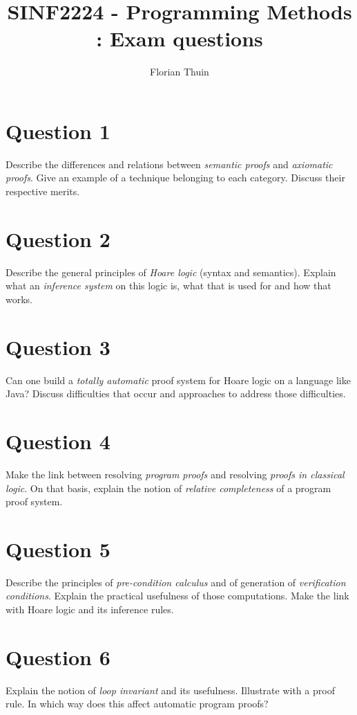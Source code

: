 \documentclass{article}
\author{Florian Thuin}
\title{SINF2224 - Programming Methods : Exam questions}
\begin{document}
  \section{Question 1}
  Describe the differences and relations between \textit{semantic proofs} and
  \textit{axiomatic proofs}. Give an example of a technique belonging to each
  category. Discuss their respective merits. \newline

  \section{Question 2}
  Describe the general principles of \textit{Hoare logic} (syntax and
  semantics). Explain what an \textit{inference system} on this logic is, what
  that is used for and how that works. \newline

  \section{Question 3}
  Can one build a \textit{totally automatic} proof system for Hoare logic on a
  language like Java? Discuss difficulties that occur and approaches to address
  those difficulties. \newline

  \section{Question 4}
  Make the link between resolving \textit{program proofs} and resolving
  \textit{proofs in classical logic}. On that basis, explain the notion of
  \textit{relative completeness} of a program proof system. \newline

  \section{Question 5}
  Describe the principles of \textit{pre-condition calculus} and of generation
  of \textit{verification conditions}. Explain the practical usefulness of those
  computations. Make the link with Hoare logic and its inference rules. \newline

  \section{Question 6}
  Explain the notion of \textit{loop invariant} and its usefulness. Illustrate
  with a proof rule. In which way does this affect automatic program proofs?
  \newline
\end{document}
